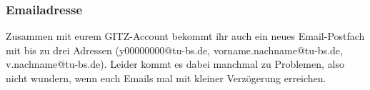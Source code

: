 	\subsubsection{Emailadresse}
		Zusammen mit eurem GITZ-Account bekommt ihr auch ein
		neues Email-Postfach mit bis zu drei Adressen
		(y00000000@tu-bs.de, vorname.nachname@tu-bs.de,
		v.nachname@tu-bs.de). Leider kommt es dabei manchmal zu
		Problemen, also nicht wundern, wenn euch Emails mal mit
		kleiner Verzögerung erreichen. 


%


